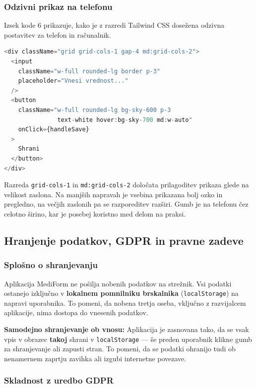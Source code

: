 \documentclass[12pt,a4paper]{article}
\begin{document}
\subsubsection{Odzivni prikaz na telefonu}

Izsek kode 6 prikazuje, kako je z razredi Tailwind CSS dose\v{z}ena odzivna postavitev za telefon in ra\v{c}unalnik.

\begin{lstlisting}[language=JavaScript, caption={Izsek kode 6: Odzivna postavitev z razredi Tailwind CSS}]
<div className="grid grid-cols-1 gap-4 md:grid-cols-2">
  <input
    className="w-full rounded-lg border p-3"
    placeholder="Vnesi vrednost..."
  />
  <button
    className="w-full rounded-lg bg-sky-600 p-3
               text-white hover:bg-sky-700 md:w-auto"
    onClick={handleSave}
  >
    Shrani
  </button>
</div>
\end{lstlisting}

Razreda \texttt{grid-cols-1} in \texttt{md:grid-cols-2} določata prilagoditev prikaza glede na velikost zaslona. Na manjših napravah je vsebina prikazana bolj ozko in pregledno, na večjih zaslonih pa se razporeditev razširi. Gumb je na telefonu čez celotno širino, kar je posebej koristno med delom na praksi.

\subsection{Hranjenje podatkov, GDPR in pravne zadeve}

\subsubsection{Splo\v{s}no o shranjevanju}

Aplikacija MediForm ne po\v{s}ilja nobenih podatkov na stre\v{z}nik. Vsi podatki ostanejo izklju\v{c}no v \textbf{lokalnem pomnilniku brskalnika} (\texttt{localStorage}) na napravi uporabnika. To pomeni, da nobena tretja oseba, vklju\v{c}no z razvijalcem aplikacije, nima dostopa do vnesenih podatkov.

\textbf{Samodejno shranjevanje ob vnosu:} Aplikacija je zasnovana tako, da se vsak vpis v obrazec \textbf{takoj} shrani v \texttt{localStorage} --- \v{s}e preden uporabnik klikne gumb za shranjevanje ali zapusti stran. To pomeni, da se podatki ohranijo tudi ob nenamernem zaprtju zavihka ali izgubi internetne povezave.

\subsubsection{Skladnost z uredbo GDPR}
\end{document}
